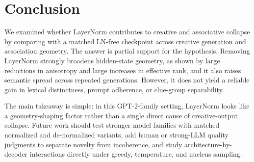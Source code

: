 \section{Conclusion}
\label{sec:conclusion}

We examined whether LayerNorm contributes to creative and associative collapse by comparing \gpttwo with a matched LN-free checkpoint across creative generation and association geometry. The answer is partial support for the hypothesis. Removing LayerNorm strongly broadens hidden-state geometry, as shown by large reductions in anisotropy and large increases in effective rank, and it also raises semantic spread across repeated generations. However, it does not yield a reliable gain in lexical distinctness, prompt adherence, or clue-group separability.

The main takeaway is simple: in this GPT-2-family setting, LayerNorm looks like a geometry-shaping factor rather than a single direct cause of creative-output collapse. Future work should test stronger model families with matched normalized and de-normalized variants, add human or strong-LLM quality judgments to separate novelty from incoherence, and study architecture-by-decoder interactions directly under greedy, temperature, and nucleus sampling.
